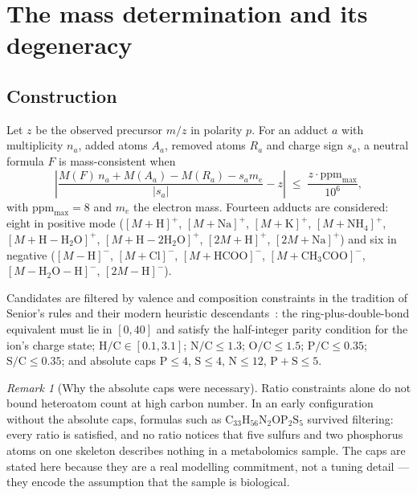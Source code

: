 \documentclass[11pt,twocolumn,a4paper]{article}
\theoremstyle{definition}
\theoremstyle{remark}
\newtheorem{remark}[theorem]{Remark}
\newcommand{\ppm}{\mathrm{ppm}}
\begin{document}
\section{The mass determination and its degeneracy}
\label{sec:degeneracy}

\subsection{Construction}

Let $z$ be the observed precursor $m/z$ in polarity $p$. For an adduct $a$ with
multiplicity $n_a$, added atoms $A_a$, removed atoms $R_a$ and charge sign
$s_a$, a neutral formula $F$ is mass-consistent when
\begin{equation}
\left| \frac{M(F)\,n_a + M(A_a) - M(R_a) - s_a m_e}{|s_a|} - z \right|
\;\le\; \frac{z \cdot \ppm_{\max}}{10^6},
\label{eq:d1}
\end{equation}
with $\ppm_{\max} = 8$ and $m_e$ the electron mass. Fourteen adducts are
considered: eight in positive mode ($[M+\mathrm{H}]^+$, $[M+\mathrm{Na}]^+$,
$[M+\mathrm{K}]^+$, $[M+\mathrm{NH_4}]^+$, $[M+\mathrm{H}-\mathrm{H_2O}]^+$,
$[M+\mathrm{H}-2\mathrm{H_2O}]^+$, $[2M+\mathrm{H}]^+$, $[2M+\mathrm{Na}]^+$) and
six in negative ($[M-\mathrm{H}]^-$, $[M+\mathrm{Cl}]^-$,
$[M+\mathrm{HCOO}]^-$, $[M+\mathrm{CH_3COO}]^-$,
$[M-\mathrm{H_2O}-\mathrm{H}]^-$, $[2M-\mathrm{H}]^-$).

Candidates are filtered by valence and composition constraints in the tradition
of Senior's rules and their modern heuristic
descendants~\citep{senior1951partitions,kind2007seven}: the ring-plus-double-bond
equivalent must lie in $[0,40]$ and satisfy the half-integer parity condition for
the ion's charge state; $\mathrm{H}/\mathrm{C} \in [0.1, 3.1]$;
$\mathrm{N}/\mathrm{C} \le 1.3$; $\mathrm{O}/\mathrm{C} \le 1.5$;
$\mathrm{P}/\mathrm{C} \le 0.35$; $\mathrm{S}/\mathrm{C} \le 0.35$; and absolute
caps $\mathrm{P} \le 4$, $\mathrm{S} \le 4$, $\mathrm{N} \le 12$,
$\mathrm{P}+\mathrm{S} \le 5$.

\begin{remark}[Why the absolute caps were necessary]
Ratio constraints alone do not bound heteroatom count at high carbon number. In an
early configuration without the absolute caps, formulas such as
$\mathrm{C}_{33}\mathrm{H}_{56}\mathrm{N}_2\mathrm{O}\mathrm{P}_2\mathrm{S}_5$
survived filtering: every ratio is satisfied, and no ratio notices that five
sulfurs and two phosphorus atoms on one skeleton describes nothing in a
metabolomics sample. The caps are stated here because they are a real
modelling commitment, not a tuning detail --- they encode the assumption that the
sample is biological.
\end{remark}
\end{document}
